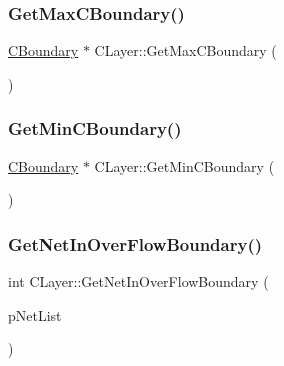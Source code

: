 \mbox{\label{classCLayer_a652cae101ce82d66873c9c8cae3f24a4}} 
\subsubsection{\texorpdfstring{GetMaxCBoundary()}{GetMaxCBoundary()}}
{\footnotesize\ttfamily \mbox{\hyperlink{classCBoundary}{C\+Boundary}} $\ast$ C\+Layer\+::\+Get\+Max\+C\+Boundary (\begin{DoxyParamCaption}{ }\end{DoxyParamCaption})}

\mbox{\label{classCLayer_a7d13386d2796be6a0380cba598df5882}} 
\subsubsection{\texorpdfstring{GetMinCBoundary()}{GetMinCBoundary()}}
{\footnotesize\ttfamily \mbox{\hyperlink{classCBoundary}{C\+Boundary}} $\ast$ C\+Layer\+::\+Get\+Min\+C\+Boundary (\begin{DoxyParamCaption}{ }\end{DoxyParamCaption})}

\mbox{\label{classCLayer_a4d36fe6154f539a253380daf5ed0bedc}} 
\subsubsection{\texorpdfstring{GetNetInOverFlowBoundary()}{GetNetInOverFlowBoundary()}}
{\footnotesize\ttfamily int C\+Layer\+::\+Get\+Net\+In\+Over\+Flow\+Boundary (\begin{DoxyParamCaption}\item[{hash\+\_\+map$<$ \mbox{\hyperlink{BoxRouter_8h_a280feb883e9d4a7edcc69c8bcb9f38f2}{A\+D\+D\+R\+E\+SS}}, int $>$ $\ast$}]{p\+Net\+List }\end{DoxyParamCaption})}

\mbox{\label{classCLayer_a402e96f6e8f284e145062e85caf73588}} 
